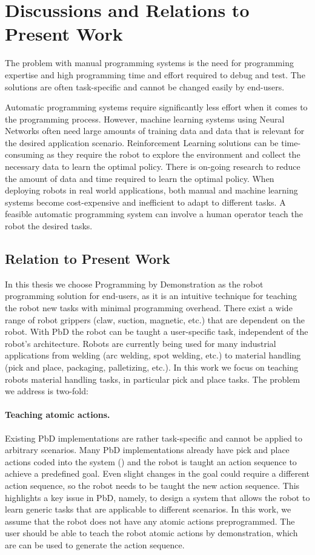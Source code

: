 \section{Discussions and Relations to Present Work}
The problem with manual programming systems is the need for programming expertise and high programming time and effort required to debug and test.
The solutions are often task-specific and cannot be changed easily by end-users.

Automatic programming systems require significantly less effort when it comes to the programming process. 
However, machine learning systems using Neural Networks often need large amounts of training data and data that is relevant for the desired application scenario.
Reinforcement Learning solutions can be time-consuming as they require the robot to explore the environment and collect the necessary data to learn the optimal policy.
There is on-going research to reduce the amount of data and time required to learn the optimal policy.
When deploying robots in real world applications, both manual and machine learning systems become cost-expensive and inefficient to adapt to different tasks.
A feasible automatic programming system can involve a human operator teach the robot the desired tasks.


\subsection{Relation to Present Work}
In this thesis we choose Programming by Demonstration as the robot programming solution for end-users, as it is an intuitive technique for teaching the robot new tasks with minimal programming overhead.
There exist a wide range of robot grippers (claw, suction, magnetic, etc.) that are dependent on the robot.
With PbD the robot can be taught a user-specific task, independent of the robot's architecture.
Robots are currently being used for many industrial applications from welding (arc welding, spot welding, etc.) to material handling (pick and place, packaging, palletizing, etc.).
In this work we focus on teaching robots material handling tasks, in particular pick and place tasks.
The problem we address is two-fold:

\paragraph{Teaching atomic actions.}
Existing PbD implementations are rather task-specific and cannot be applied to arbitrary scenarios.
Many PbD implementations already have pick and place actions coded into the system (\cite{veeraraghavan2008teaching}) and the robot is taught an action sequence to achieve a predefined goal.
Even slight changes in the goal could require a different action sequence, so the robot needs to be taught the new action sequence.
This highlights a key issue in PbD, namely, to design a system that allows the robot to learn  generic tasks that are applicable to different scenarios.
In this work, we assume that the robot does not have any atomic actions preprogrammed.
The user should be able to teach the robot atomic actions by demonstration, which are can be used to generate the action sequence.

